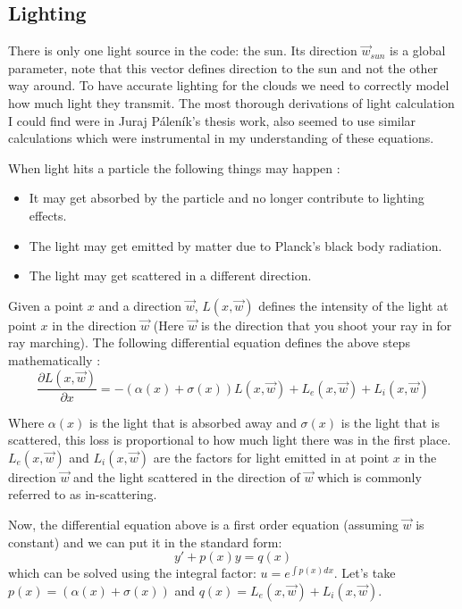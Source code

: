 \subsection{Lighting}
There is only one light source in the code: the sun. Its direction $\vec{w}_{sun}$ is a global parameter, note that this vector defines direction to the sun and not the other way around. To have accurate lighting for the clouds we need to correctly model how much light they transmit. The most thorough derivations of light calculation I could find were in Juraj Páleník's \cite{palenik2016volumetricclouds} thesis work, \cite{sebestianlague2019} \cite{reinder2018} also seemed to use similar calculations which were instrumental in my understanding of these equations.

When light hits a particle the following things may happen \cite{palenik2016volumetricclouds}:
\begin{itemize}
    \item It may get absorbed by the particle and no longer contribute to lighting effects.
    \item The light may get emitted by matter due to Planck's black body radiation.
    \item The light may get scattered in a different direction.
\end{itemize}

Given a point $x$ and a direction $\vec{w}$, $L(x, \vec{w})$ defines the intensity of the light at point $x$ in the direction $\vec{w}$ (Here $\vec{w}$ is the direction that you shoot your ray in for ray marching). The following differential equation defines the above steps mathematically \cite{palenik2016volumetricclouds}:
\[
    \frac{\partial{L(x, \vec{w})}}{\partial{x}} = -(\alpha(x) + \sigma(x))L(x, \vec{w}) + L_e(x, \vec{w}) + L_i(x, \vec{w}) 
\]

Where $\alpha(x)$ is the light that is absorbed away and $\sigma(x)$ is the light that is scattered, this loss is proportional to how much light there was in the first place. $L_e(x, \vec{w})$ and $L_i(x, \vec{w})$ are the factors for light emitted in at point $x$ in the direction $\vec{w}$ and the light scattered in the direction of $\vec{w}$ which is commonly referred to as in-scattering.

Now, the differential equation above is a first order equation (assuming $\vec{w}$ is constant) and we can put it in the standard form: 
\[
    y' + p(x)y = q(x)
\]
which can be solved using the integral factor: $u=e^{\int{p(x)dx}}$. Let's take $p(x) = (\alpha(x) + \sigma(x))$ and $q(x) = L_e(x, \vec{w}) + L_i(x, \vec{w})$.

